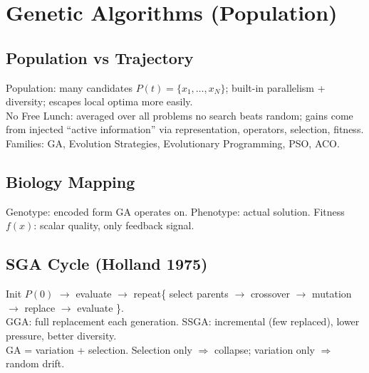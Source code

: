 \section{Genetic Algorithms (Population)}

\subsection*{Population vs Trajectory}
Population: many candidates \( P(t)=\{x_1,\dots,x_N\} \); built-in parallelism + diversity; escapes local optima more easily.\\
No Free Lunch: averaged over all problems no search beats random; gains come from injected ``active information'' via representation, operators, selection, fitness.\\
Families: GA, Evolution Strategies, Evolutionary Programming, PSO, ACO.

\subsection*{Biology Mapping}
Genotype: encoded form GA operates on. Phenotype: actual solution. Fitness \(f(x)\): scalar quality, only feedback signal.

\subsection*{SGA Cycle (Holland 1975)}
Init \(P(0)\) \(\to\) evaluate \(\to\) repeat\{ select parents \(\to\) crossover \(\to\) mutation \(\to\) replace \(\to\) evaluate \}.\\
GGA: full replacement each generation. SSGA: incremental (few replaced), lower pressure, better diversity.\\
GA = variation + selection. Selection only \(\Rightarrow\) collapse; variation only \(\Rightarrow\) random drift.


